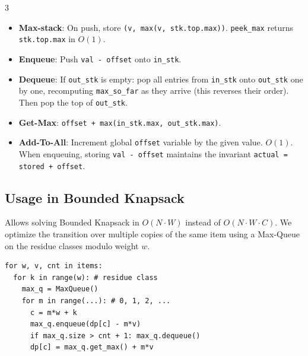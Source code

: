 \documentclass[7pt,landscape]{extarticle}
\begin{document}
\begin{multicols*}{3}
\begin{itemize}
    \item \textbf{Max-stack}: On push, store \texttt{(v, max(v, stk.top.max))}. \texttt{peek\_max} returns \texttt{stk.top.max} in $O(1)$.
    \item \textbf{Enqueue}: Push \texttt{val - offset} onto \texttt{in\_stk}.
    \item \textbf{Dequeue}: If \texttt{out\_stk} is empty: pop all entries from \texttt{in\_stk} onto \texttt{out\_stk} one by one, recomputing \texttt{max\_so\_far} as they arrive (this reverses their order). Then pop the top of \texttt{out\_stk}. 
    \item \textbf{Get-Max}: \texttt{offset + max(in\_stk.max, out\_stk.max)}.
    \item \textbf{Add-To-All}: Increment global \texttt{offset} variable by the given value. $O(1)$. When enqueuing, storing \texttt{val - offset} maintains the invariant \texttt{actual = stored + offset}.
\end{itemize}

\subsection*{Usage in Bounded Knapsack}
Allows solving Bounded Knapsack in $O(N \cdot W)$ instead of $O(N \cdot W \cdot C)$. We optimize the transition over multiple copies of the same item using a Max-Queue on the residue classes modulo weight $w$.
\begin{lstlisting}
for w, v, cnt in items:
  for k in range(w): # residue class
    max_q = MaxQueue()
    for m in range(...): # 0, 1, 2, ...
      c = m*w + k
      max_q.enqueue(dp[c] - m*v)
      if max_q.size > cnt + 1: max_q.dequeue()
      dp[c] = max_q.get_max() + m*v
\end{lstlisting}

\end{multicols*}
\end{document}
